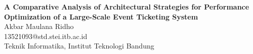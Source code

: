 \documentclass[a0,landscape]{config/poster/a0poster}
\begin{document}

\begin{minipage}[c]{0.8\linewidth}
    \veryHuge \textbf{A Comparative Analysis of Architectural Strategies for Performance Optimization of a Large-Scale Event Ticketing System} \\[1.5cm]
    \LARGE {Akbar Maulana Ridho} \\
    \Large {13521093@std.stei.itb.ac.id} \\
    \Large {Teknik Informatika, Institut Teknologi Bandung}
\end{minipage}

\vspace{1cm} %

\end{document}
